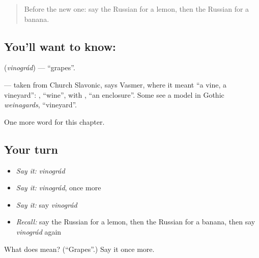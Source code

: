 \label{lesson:RU-C223-vinograd}



\begin{quote}
Before the new one: say the Russian for a lemon, then the Russian for a banana.
\end{quote}

\subsection*{You'll want to know: }
\textbf{} (\emph{vinográd}) — \textquotedblleft{}grapes\textquotedblright{}.

\begin{cousinweb}
\textbf{} — taken from Church Slavonic, says Vasmer, where it meant \textquotedblleft{}a vine, a vineyard\textquotedblright{}: \emph{}, \textquotedblleft{}wine\textquotedblright{}, with \emph{}, \textquotedblleft{}an enclosure\textquotedblright{}. Some see a model in Gothic \emph{weinagards}, \textquotedblleft{}vineyard\textquotedblright{}.
\end{cousinweb}

\begin{grammarlens}[title={What you've built}]
One more word for this chapter.
\end{grammarlens}

\subsection*{Your turn}
\begin{itemize}
\raggedright
  \item \emph{Say it:} \emph{vinográd}
  \item \emph{Say it:} \emph{vinográd}, once more
  \item \emph{Say it:} say \emph{vinográd}
  \item \emph{Recall:} say the Russian for a lemon, then the Russian for a banana, then say \emph{vinográd} again
\end{itemize}

\begin{tcolorbox}[breakable,colback=teal!4,colframe=teal!35!black,title={Before you move on}]
What does  mean? (\textquotedblleft{}Grapes\textquotedblright{}.) Say it once more.
\end{tcolorbox}
